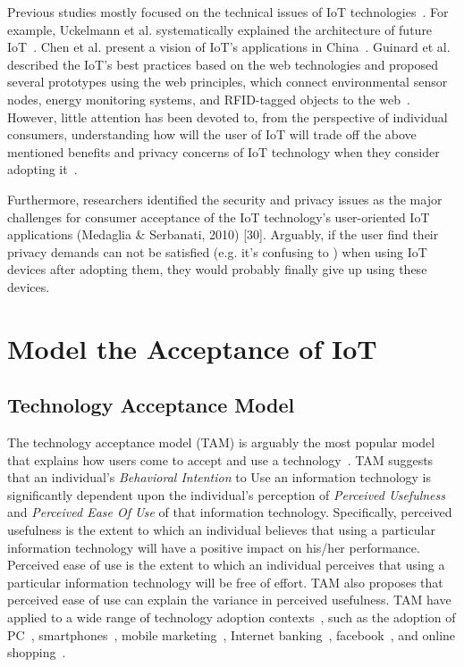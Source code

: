 Previous studies mostly focused on the technical issues of IoT technologies~\cite{fantana2013iot, lazarescu2013design, shang2012internet}. For example, Uckelmann et al. systematically explained the architecture of future IoT~\cite{uckelmann2011architectural}. Chen et al. present a vision of IoT's applications in China~\cite{chen2014vision}. Guinard et al. described the IoT’s best practices based on the web technologies and proposed several prototypes using the web principles, which connect environmental sensor nodes, energy monitoring systems, and RFID-tagged objects to the web~\cite{guinard2011internet}. However, little attention has been devoted to, from the perspective of individual consumers, understanding how will the user of IoT will trade off the above mentioned benefits and privacy concerns of IoT technology when they consider adopting it~\cite{al2016modeling, gao2014unified, mital2018adoption}.

Furthermore, researchers identified the security and privacy issues as the major challenges for consumer acceptance of the IoT technology’s user-oriented IoT applications (Medaglia \& Serbanati, 2010) [30]. Arguably, if the user find their privacy demands can not be satisfied (e.g. it's confusing to ) when using IoT devices after adopting them, they would probably finally give up using these devices.

\section{Model the Acceptance of IoT}
\subsection{Technology Acceptance Model}
The technology acceptance model (TAM) is arguably the most popular model that explains how users come to accept and use a technology~\cite{davis1989user}. TAM suggests that an individual's \textit{Behavioral Intention} to Use an information technology is significantly dependent upon the individual's perception of \textit{Perceived Usefulness} and \textit{Perceived Ease Of Use} of that information technology. Specifically, perceived usefulness is the extent to which an individual believes that using a particular information technology will have a positive impact on his/her performance. Perceived ease of use is the extent to which an individual perceives that using a particular information technology will be free of effort. TAM also proposes that perceived ease of use can explain the variance in perceived usefulness.
TAM have applied to a wide range of technology adoption contexts~\cite{wixom2005theoretical}, such as the adoption of PC~\cite{venkatesh2001longitudinal}, smartphones~\cite{park2007acceptance}, mobile marketing~\cite{bauer2005driving}, Internet banking~\cite{pikkarainen2004consumer}, facebook~\cite{lee2012effect, rauniar2014technology}, and online shopping~\cite{gefen2003trust}.


